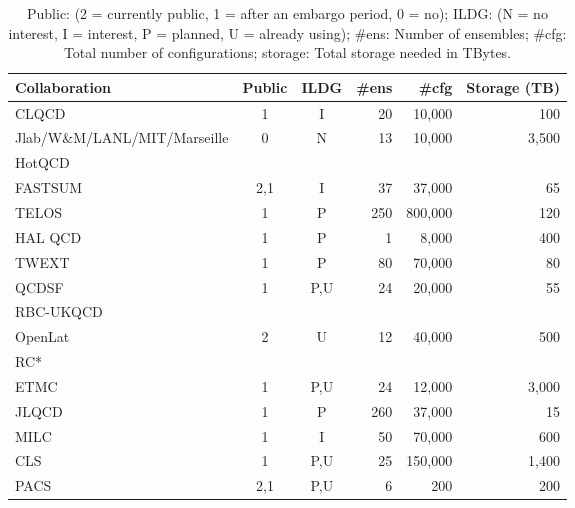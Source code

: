 \documentclass[a4paper,11pt]{article}
\begin{document}
\begin{table}[h]
  \caption{ Public: (2 = currently public, 1 = after an embargo period, 0 = no); ILDG: (N = no interest, I =
    interest, P = planned, U = already using); \#ens: Number of
    ensembles; \#cfg: Total number of configurations; storage: Total
    storage needed in TBytes.
    \label{tab:summary}
  }
  \centering
  \begin{tabular}{lccrrr}\hline\hline
    Collaboration                & Public & ILDG & \#ens & \#cfg   & Storage (TB) \\\hline
    CLQCD                        & 1      & I    & 20    & 10,000  & 100          \\
    Jlab/W\&M/LANL/MIT/Marseille & 0      & N    & 13    & 10,000  & 3,500        \\
    HotQCD                       &        &      &       &         &              \\
    FASTSUM                      & 2,1    & I    & 37    & 37,000  & 65           \\
    TELOS                        & 1      & P    & 250   & 800,000 & 120          \\
    HAL QCD                      & 1      & P    &  1    &  8,000  & 400          \\
    TWEXT                        & 1      & P    & 80    & 70,000  & 80           \\
    QCDSF                        & 1      & P,U  & 24    & 20,000  & 55           \\
    RBC-UKQCD                    &        &      &       &         &              \\
    OpenLat                      & 2      & U    & 12    & 40,000  & 500          \\
    RC*                          &        &      &       &         &              \\
    ETMC                         & 1      & P,U  & 24    & 12,000  & 3,000        \\
    JLQCD                        & 1      & P    & 260   & 37,000  & 15           \\
    MILC                         & 1      & I    & 50    & 70,000  & 600          \\
    CLS                          & 1      & P,U  & 25    & 150,000 & 1,400        \\
    PACS                         & 2,1    & P,U  & 6     & 200     & 200          \\\hline\hline
  \end{tabular}
\end{table}
\end{document}
